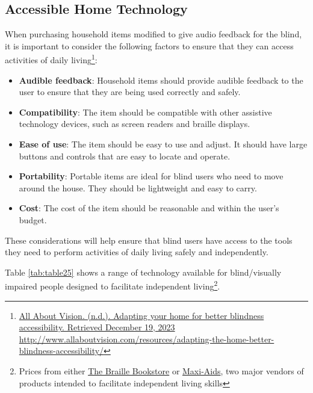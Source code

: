\hypertarget{ind-living-tools}{}\subsection{Accessible Home Technology}\label{ind-living-tools}
When purchasing household items modified to give audio feedback for the blind, it is important to consider the following factors to ensure that they can access activities of daily living\footnote{\raggedright \href{http://www.allaboutvision.com/resources/adapting-the-home-better-blindness-accessibility/}{All About Vision. (n.d.). Adapting your home for better blindness accessibility. Retrieved December 19, 2023} \url{http://www.allaboutvision.com/resources/adapting-the-home-better-blindness-accessibility/}}:
\begin{itemize}[leftmargin=*]
\item \textbf{Audible feedback}: Household items should provide audible feedback to the user to ensure that they are being used correctly and safely.
\item \textbf{Compatibility}: The item should be compatible with other assistive technology devices, such as screen readers and braille displays.
\item \textbf{Ease of use}: The item should be easy to use and adjust. It should have large buttons and controls that are easy to locate and operate.
\item \textbf{Portability}: Portable items are ideal for blind users who need to move around the house. They should be lightweight and easy to carry.
\item \textbf{Cost}: The cost of the item should be reasonable and within the user’s budget.
\end{itemize}
These considerations will help ensure that blind users have access to the tools they need to perform activities of daily living safely and independently.

Table \ref{tab:table25} shows a range of technology available for blind/visually impaired people designed to facilitate independent living\footnote{\raggedright Prices from either \href{http://www.braillebookstore.com/}{The Braille Bookstore} or \href{http://www.maxiaids.com/}{Maxi-Aids}, two major vendors of products intended to facilitate independent living skills}.

